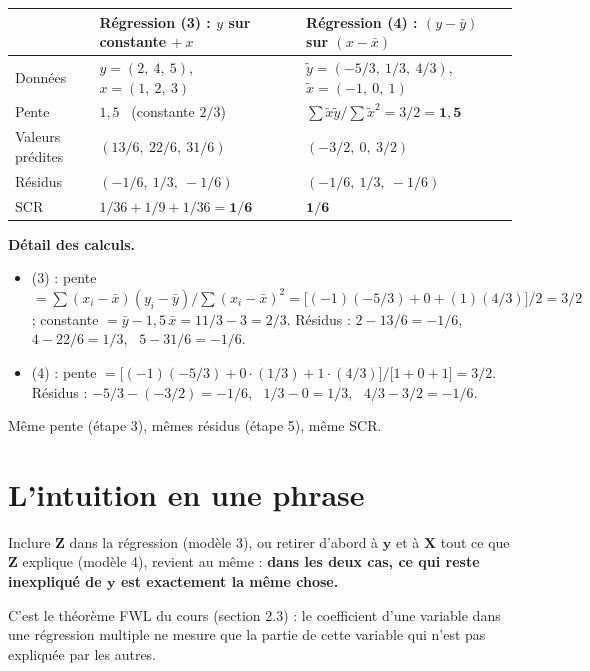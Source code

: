 \documentclass[11pt,a4paper]{article}
\newcommand{\vy}{\mathbf{y}}\newcommand{\vX}{\mathbf{X}}\newcommand{\vZ}{\mathbf{Z}}
\begin{document}
\begin{center}
\renewcommand{\arraystretch}{1.35}
\begin{tabular}{@{}lll@{}}
\toprule
& Régression (3) : $y$ sur constante $+\ x$ & Régression (4) : $(y-\bar y)$ sur $(x-\bar x)$ \\
\midrule
Données & $y=(2,\ 4,\ 5)$, \ $x=(1,\ 2,\ 3)$ & $\tilde y=(-5/3,\ 1/3,\ 4/3)$, \ $\tilde x=(-1,\ 0,\ 1)$ \\
Pente & $1{,}5$ \ (constante $2/3$) & $\sum\tilde x\tilde y/\sum\tilde x^2=3/2=\mathbf{1{,}5}$ \\
Valeurs prédites & $(13/6,\ 22/6,\ 31/6)$ & $(-3/2,\ 0,\ 3/2)$ \\
Résidus & $(-1/6,\ 1/3,\ -1/6)$ & $(-1/6,\ 1/3,\ -1/6)$ \\
SCR & $1/36+1/9+1/36=\mathbf{1/6}$ & $\mathbf{1/6}$ \\
\bottomrule
\end{tabular}
\end{center}

\textbf{Détail des calculs.}
\begin{itemize}[nosep]
\item (3) : pente $=\sum(x_i-\bar x)(y_i-\bar y)/\sum(x_i-\bar x)^2=\big[(-1)(-5/3)+0+(1)(4/3)\big]/2=3/2$ ; constante $=\bar y-1{,}5\,\bar x=11/3-3=2/3$. Résidus : $2-13/6=-1/6$, \ $4-22/6=1/3$, \ $5-31/6=-1/6$.
\item (4) : pente $=\big[(-1)(-5/3)+0\cdot(1/3)+1\cdot(4/3)\big]/\big[1+0+1\big]=3/2$. Résidus : $-5/3-(-3/2)=-1/6$, \ $1/3-0=1/3$, \ $4/3-3/2=-1/6$.
\end{itemize}
Même pente (étape 3), mêmes résidus (étape 5), même SCR. \checkmark

\section{L'intuition en une phrase}

\begin{cle}[title={Intuition}]
Inclure $\vZ$ dans la régression (modèle 3), ou retirer d'abord à $\vy$ et à $\vX$ tout ce que $\vZ$ explique (modèle 4), revient au même : \textbf{dans les deux cas, ce qui reste inexpliqué de $\vy$ est exactement la même chose.}

C'est le théorème FWL du cours (section 2.3) : le coefficient d'une variable dans une régression multiple ne mesure que la partie de cette variable qui n'est pas expliquée par les autres.
\end{cle}
\end{document}
